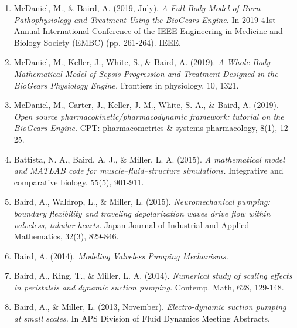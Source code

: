 
\begin{cventries}
  \cventry
    {} %
    {} %
    {} %
    {} %
    {
      \begin{cvitems} %
      \begin{enumerate}
        \item {McDaniel, M., \& Baird, A. (2019, July). \textit{A Full-Body Model of Burn Pathophysiology and Treatment Using the BioGears Engine.} In 2019 41st Annual International Conference of the IEEE Engineering in Medicine and Biology Society (EMBC) (pp. 261-264). IEEE.}
        \item {McDaniel, M., Keller, J., White, S., \& Baird, A. (2019). \textit{A Whole-Body Mathematical Model of Sepsis Progression and Treatment Designed in the BioGears Physiology Engine.} Frontiers in physiology, 10, 1321.}
        \item{McDaniel, M., Carter, J., Keller, J. M., White, S. A., \& Baird, A. (2019). \textit{Open source pharmacokinetic/pharmacodynamic framework: tutorial on the BioGears Engine.} CPT: pharmacometrics \& systems pharmacology, 8(1), 12-25.}
        \item{Battista, N. A., Baird, A. J., \& Miller, L. A. (2015). \textit{A mathematical model and MATLAB code for muscle–fluid–structure simulations.} Integrative and comparative biology, 55(5), 901-911.}
        \item{Baird, A., Waldrop, L., \& Miller, L. (2015). \textit{Neuromechanical pumping: boundary flexibility and traveling depolarization waves drive flow within valveless, tubular hearts.} Japan Journal of Industrial and Applied Mathematics, 32(3), 829-846.}
        \item{Baird, A. (2014). \textit{Modeling Valveless Pumping Mechanisms.}}
        \item{Baird, A., King, T., \& Miller, L. A. (2014). \textit{Numerical study of scaling effects in peristalsis and dynamic suction pumping.} Contemp. Math, 628, 129-148.}
        \item{Baird, A., \& Miller, L. (2013, November). \textit{Electro-dynamic suction pumping at small scales.} In APS Division of Fluid Dynamics Meeting Abstracts.}
      \end{enumerate}
      \end{cvitems}
    }
\end{cventries}